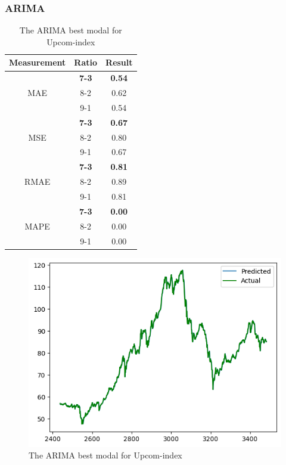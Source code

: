 \documentclass{ieeeojies}
\begin{document}
\subsubsection{ARIMA}
\begin{table}[H]
    \centering
    \begin{tabular}{|c|c|c|}
        \hline
         Measurement & Ratio &  Result  \\
        \hline
             & \textbf{7-3} & \textbf{0.54}  \\
        MAE  & 8-2 & 0.62  \\
            & 9-1 & 0.54  \\
        \hline
           & \textbf{7-3} & \textbf{0.67}  \\
        MSE  & 8-2 & 0.80  \\
            & 9-1 & 0.67  \\
        \hline
           & \textbf{7-3} & \textbf{0.81}  \\
        RMAE  & 8-2 & 0.89  \\
            & 9-1 & 0.81  \\
        \hline
           & \textbf{7-3} & \textbf{0.00}  \\
        MAPE  & 8-2 & 0.00  \\
            & 9-1 & 0.00  \\
        \hline
    \end{tabular}
\begin{figure}[H]
    \centering
    \includegraphics[width=0.8\linewidth]{ARIMA-UPC-73.png}
    \caption{The ARIMA best modal for Upcom-index}
    \label{fig:example}
\end{figure}

    \label{table:example}
\end{table}
\end{document}
